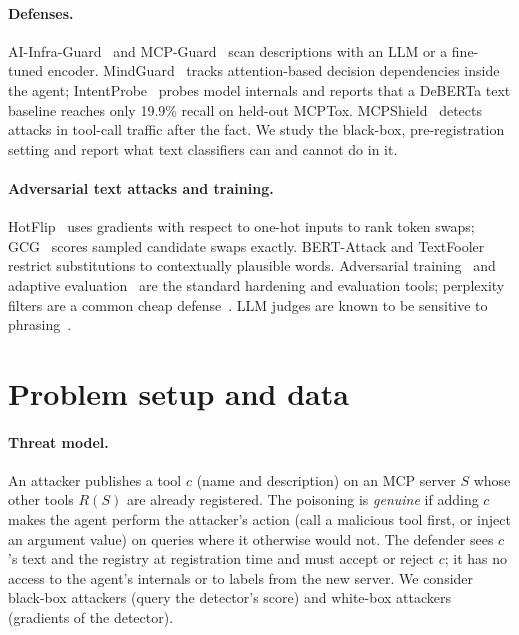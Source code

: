 \documentclass{article}
\begin{document}
\paragraph{Defenses.} AI-Infra-Guard~\cite{aiinfraguard} and MCP-Guard~\cite{xing2025mcpguard} scan descriptions with
an LLM or a fine-tuned encoder. MindGuard~\cite{wang2025mindguard} tracks attention-based decision dependencies inside
the agent; IntentProbe~\cite{intentprobe2026} probes model internals and reports that a DeBERTa text baseline reaches
only 19.9\% recall on held-out MCPTox. MCPShield~\cite{mcpshield2026graph} detects attacks in tool-call traffic after
the fact. We study the black-box, pre-registration setting and report what text classifiers can and cannot do in it.

\paragraph{Adversarial text attacks and training.} HotFlip~\cite{ebrahimi2018hotflip} uses gradients with respect to
one-hot inputs to rank token swaps; GCG~\cite{zou2023gcg} scores sampled candidate swaps exactly. BERT-Attack and
TextFooler~\cite{li2020bertattack,jin2020textfooler} restrict substitutions to contextually plausible words. Adversarial
training~\cite{madry2018towards} and adaptive evaluation~\cite{tramer2020adaptive} are the standard hardening and
evaluation tools; perplexity filters are a common cheap defense~\cite{jain2023baseline}. LLM judges are known to be
sensitive to phrasing~\cite{zheng2023judging}.

\section{Problem setup and data}
\label{sec:setup}

\paragraph{Threat model.} An attacker publishes a tool $c$ (name and description) on an MCP server $S$ whose other tools
$R(S)$ are already registered. The poisoning is \emph{genuine} if adding $c$ makes the agent perform the attacker's
action (call a malicious tool first, or inject an argument value) on queries where it otherwise would not. The defender
sees $c$'s text and the registry at registration time and must accept or reject $c$; it has no access to the agent's
internals or to labels from the new server. We consider black-box attackers (query the detector's score) and white-box
attackers (gradients of the detector).
\end{document}
